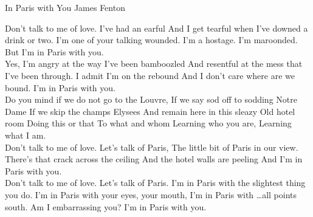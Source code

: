 \begin{poem}
{In Paris with You}
{James Fenton}

 Don't talk to me of love.  I've had an earful
 And I get tearful when I've downed a drink or two.
 I'm one of your talking wounded.
 I'm a hostage. I'm maroonded.
 But I'm in Paris with you.\\
 
 Yes, I'm angry at the way I've been bamboozled
 And resentful at the mess that I've been through.
 I admit I'm on the rebound
 And I don't care where are we bound.
 I'm in Paris with you.\\
 
 Do you mind if we do not go to the Louvre,
 If we say sod off to sodding Notre Dame
 If we skip the champs Elysees
 And remain here in this sleazy
 Old hotel room
 Doing this or that
 To what and whom
 Learning who you are,
 Learning what I am.\\
 
 Don't talk to me of love. Let's talk of Paris,
 The little bit of Paris in our view.
 There's that crack across the ceiling
 And the hotel walls are peeling 
 And I'm in Paris with you.\\
 
 Don't talk to me of love.  Let's talk of Paris.
 I'm in Paris with the slightest thing you do.
 I'm in Paris with your eyes, your mouth,
 I'm in Paris with \ldots all points south.
 Am I embarrassing you?
 I'm in Paris with you.\\
 \end{poem}
